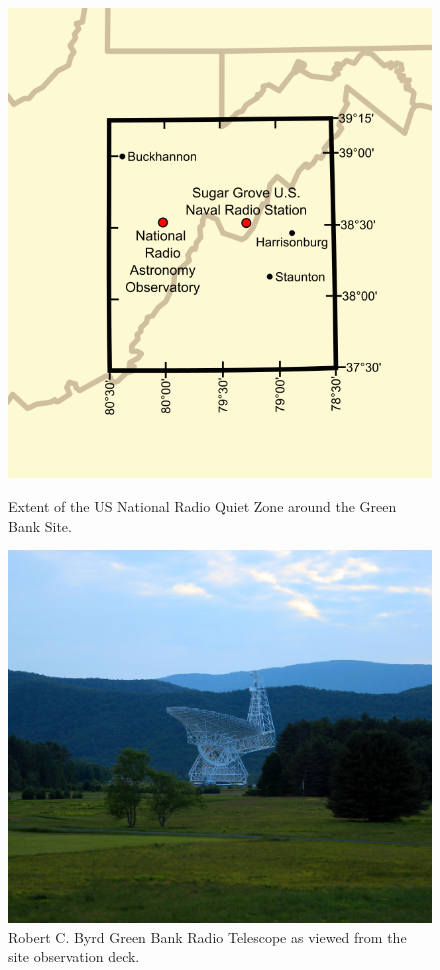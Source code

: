\begin{figure}[htb]
\centering
\begin{minipage}[b]{0.47\textwidth}
\centering
\includegraphics[width=0.75\linewidth]{RFI_testing/figures/National_Radio_Quiet_Zone.png}
\caption{Extent of the US National Radio Quiet Zone around the Green Bank Site.}
\label{Fig:nrqz}
\end{minipage}%
\begin{minipage}[b]{0.02\textwidth}
\hspace{1cm}
\end{minipage}%
\begin{minipage}[b]{0.47\textwidth}
\centering
\includegraphics[width=0.95\linewidth]{RFI_testing/figures/gbt_site.jpg}
\caption{Robert C. Byrd Green Bank Radio Telescope as viewed from the site observation deck. }
\label{Fig:gbt}
\end{minipage}
\end{figure}

